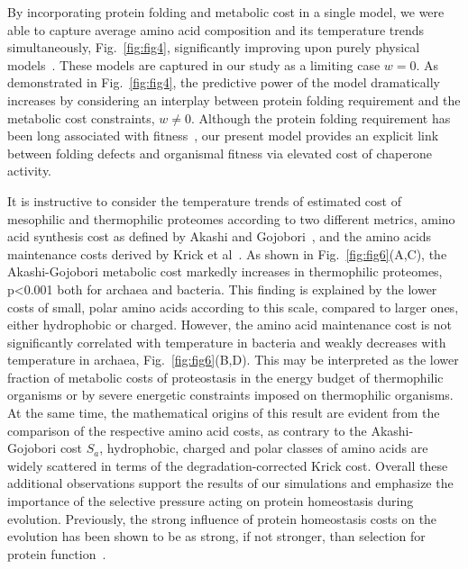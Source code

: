 \documentclass[10pt,letterpaper]{article}
\begin{document}
By incorporating protein folding and metabolic cost in a single model, we were able to capture average amino acid composition and its temperature trends simultaneously, Fig.~\ref{fig:fig4}, significantly improving upon purely physical models~\cite{Berezovsky2007Positive,Venev2015Massively}. These  models are captured in our study as a limiting case $w=0$. As demonstrated in Fig.~\ref{fig:fig4}, the predictive power of the model dramatically increases by considering an interplay between protein folding requirement and the metabolic cost constraints, $w\neq 0$. Although the protein folding requirement has been long associated with fitness~\cite{Taverna2002Why,Bloom2006Protein,Zeldovich2007First,Lobkovsky2010Universal}, our present model provides an explicit link between folding defects and organismal fitness via elevated cost of chaperone activity.

It is instructive to consider the temperature trends of estimated cost of mesophilic and thermophilic proteomes according to two different metrics, amino acid synthesis cost as defined by Akashi and Gojobori~\cite{Akashi2002Metabolic}, and the amino acids maintenance costs derived by Krick et al~\cite{Krick2014Amino}. As shown in Fig.~\ref{fig:fig6}(A,C), the Akashi-Gojobori metabolic cost markedly increases in thermophilic proteomes, p\textless0.001 both for archaea and bacteria. This finding is explained by the lower costs of small, polar amino acids according to this scale, compared to larger ones, either hydrophobic or charged. However, the amino acid maintenance cost is not significantly correlated with temperature in bacteria and weakly decreases with temperature in archaea, Fig.~\ref{fig:fig6}(B,D). This may be interpreted as the lower fraction of metabolic costs  of proteostasis in the energy budget of thermophilic organisms or by severe energetic constraints imposed on thermophilic organisms. At the same time, the mathematical origins of this result are evident from the comparison of the respective amino acid costs, as contrary to the Akashi-Gojobori cost $S_{a}$, hydrophobic, charged and polar classes of amino acids are widely scattered in terms of the degradation-corrected Krick cost. Overall these additional observations support the results of our simulations and emphasize the importance of the selective pressure acting on protein homeostasis during evolution. Previously, the strong influence of protein homeostasis costs on the evolution has been shown to be as strong, if not stronger, than selection for protein function~\cite{Assis2014Conserved}.
\end{document}
